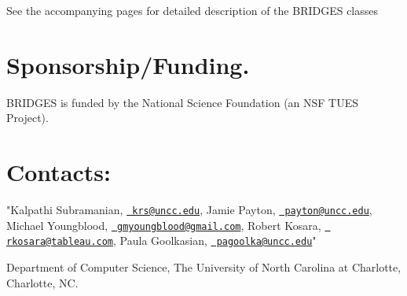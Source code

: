 See the accompanying pages for detailed description of the B\+R\+I\+D\+G\+ES classes \hypertarget{index_sponsor_sec}{}\section{Sponsorship/\+Funding.}\label{index_sponsor_sec}
B\+R\+I\+D\+G\+ES is funded by the National Science Foundation (an N\+SF T\+U\+ES Project).\hypertarget{index_contacts_sec}{}\section{Contacts\+:}\label{index_contacts_sec}
"Kalpathi Subramanian, \href{mailto:krs@uncc.edu}{\texttt{ krs@uncc.\+edu}}, Jamie Payton, \href{mailto:payton@uncc.edu}{\texttt{ payton@uncc.\+edu}}, Michael Youngblood, \href{mailto:gmyoungblood@gmail.com}{\texttt{ gmyoungblood@gmail.\+com}}, Robert Kosara, \href{mailto:rkosara@tableau.com}{\texttt{ rkosara@tableau.\+com}}, Paula Goolkasian, \href{mailto:pagoolka@uncc.edu}{\texttt{ pagoolka@uncc.\+edu}}"

Department of Computer Science, The University of North Carolina at Charlotte, Charlotte, NC. 